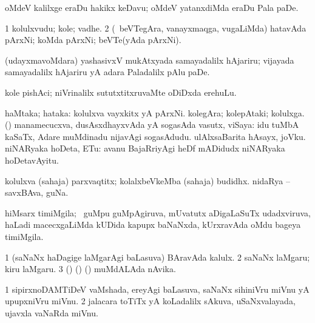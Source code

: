 \noindent
\gl{\nuga}
\bmng
{} oMdeV kalilxge eraDu hakikx keDavu; oMdeV yatanxdiMda eraDu Pala paDe. 
\emng
\eentry

\bentry
{}
\gl{\nA}
\bmng
\bnum
\num{1} kolulxvudu; kole; vadhe. 
\num{2} (\kanmu\ beVTegAra, vanayxmaqga, \mo vugaLiMda) hatavAda pArxNi; koMda pArxNi; beVTe(yAda pArxNi). 
\enum
\emng

\noindent
\gl{\nuga}
\bmng
{} (udayxmavoMdara) yashasivxV mukAtxyada samayadalilx hAjariru; vijayada samayadalilx hAjariru yA adara Paladalilx pAlu paDe. 
\emng
\eentry

\bentry
{}
\gl{\nA}
\bmng
kole pishAci; niVrinalilx sututxtitxruvaMte oDiDxda erehuLu. 
\emng
\eentry

\bentry
{}
\gl{\nA}
\bmng
\bnum
{} haMtaka; hataka: 
\banum
{} kolulxva vayxkitx yA pArxNi. 
 kolegAra; kolepAtaki; kolulxga. 
\eanum
\numie
{} (\AmA) 
\banum
{} manamecucxva, dusAsxdhayxvAda yA sogasAda vasutx, viSaya:  idu tuMbA kaSaTx, Adare muMdinadu nijavAgi sogasAdudu. 
 ulAlxsaBarita hAsayx, joVku. 
 niNARyaka hoDeta, ETu:  avanu BajaRriyAgi heDf mADidudx niNARyaka hoDetavAyitu. 
\eanum
\numie
\enum
\emng

\noindent
\gl{\pagu}
\bmng
{} 
\banum
{} kolulxva (sahaja) parxvaqtitx; kolalxbeVkeMba (sahaja) budidhx. 
 nidaRya -- savxBAva, guNa. 
\eanum
\emng
\eentry

\bentry
{}
\gl{\nA}
\bmng
hiMsarx timiMgila; \sA\ guMpu guMpAgiruva, mUvatutx aDigaLaSuTx udadxviruva, haLadi macecxgaLiMda kUDida kapupx baNaNxda, kUrxravAda oMdu bageya timiMgila. 
\emng
\eentry

\bentry
{}
\gl{\nA}
\bmng
\bnum
\num{1} (saNaNx haDagige laMgarAgi baLasuva) BAravAda kalulx. 
\num{2} saNaNx laMgaru; kiru laMgaru. 
\num{3} (\birx) (\nw) (\ashi) muMdALAda nAvika. 
\enum
\emng
\eentry

\bentry
{}
\gl{\nA}
\bmng
\bnum
\num{1} sipirxnoDAMTiDeV vaMshada, ereyAgi baLasuva, saNaNx sihiniVru miVnu yA upupxniVru miVnu. 
\num{2} jalacara toTiTx yA koLadalilx sAkuva, uSaNxvalayada, ujavxla vaNaRda miVnu. 
\enum
\emng
\eentry

